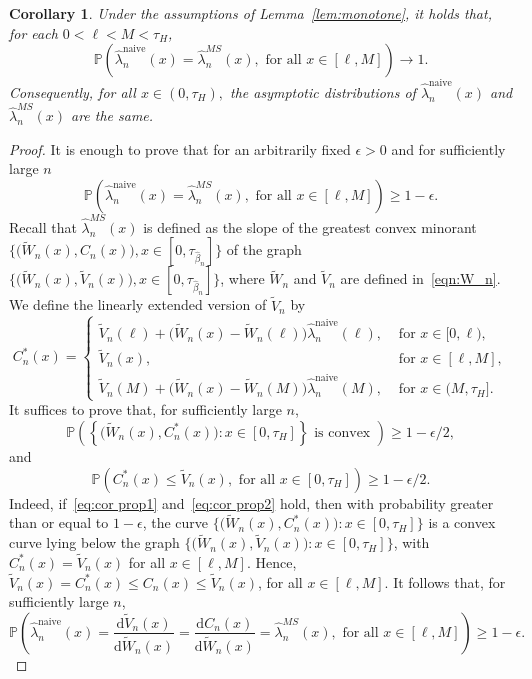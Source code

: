 \documentclass[11pt,reqno]{amsart}
\theoremstyle{definition}
\theoremstyle{plain}
\newtheorem{cor}[de]{Corollary}
\theoremstyle{remark}
\begin{document}
\begin{cor}
\label{cor:1}
Under the assumptions of Lemma~\ref{lem:monotone}, it holds that, for each $0<\ell<M<\tau_H$,
\[
{\mathbb{P}}
\left(
\hat{\lambda}_n^{\mathrm{naive}}(x)=\hat{\lambda}_n^{MS}(x),\text{ for all } x\in[\ell,M]
\right)\to 1.
\]
Consequently, for all $x\in(0,\tau_H),$ the asymptotic distributions of $\hat{\lambda}_n^{\mathrm{naive}}(x)$ and $\hat{\lambda}_n^{MS}(x)$ are the same.
\end{cor}
\begin{proof}
It is enough to prove that for an arbitrarily fixed $\epsilon>0$ and for sufficiently large $n$
\[
{\mathbb{P}}
\left(
\hat{\lambda}_n^{\mathrm{naive}}(x)=\hat{\lambda}_n^{MS}(x),\text{ for all } x\in[\ell,M]
\right)
\geq 1-\epsilon.
\]
Recall that $\hat{\lambda}^{MS}_n(x)$ is defined as the slope of the greatest convex minorant $\big\{\big(\tilde W_n(x),C_n(x)\big), x\in[0,\tau_{\hat{\beta}_n}]\big\}$ of the graph
$\big\{\big(\tilde W_n(x),\tilde V_n(x)\big),x\in[0,\tau_{\hat{\beta}_n}]\big\}$,
where $\tilde W_n$ and $\tilde V_n$ are defined in~\eqref{eqn:W_n}.
We define the linearly extended  version of $\tilde V_n$ by
\[
C^*_n(x)=
\begin{cases}
\tilde V_n(\ell)+\big(\tilde W_n(x)-\tilde W_n(\ell)\big)\hat{\lambda}_n^{\mathrm{naive}}(\ell), &\text{ for } x\in[0,\ell),\\
\tilde V_n(x), &\text{ for } x\in[\ell,M],\\
\tilde V_n(M)+\big(\tilde W_n(x)-\tilde W_n(M)\big)\hat{\lambda}_n^{\mathrm{naive}}(M), &\text{ for } x\in(M,\tau_H].
\end{cases}
\]
It suffices to prove that, for sufficiently large $n$,
\begin{equation}
\label{eq:cor prop1}
{\mathbb{P}}
\left(
\left\{
\big(\tilde W_n(x),C^*_n(x)\big):x\in[0,\tau_H]
\right\} \text{ is convex }
\right)\geq 1-\epsilon/2,
\end{equation}
and
\begin{equation}
\label{eq:cor prop2}
{\mathbb{P}}
\left(
C^*_n(x)\leq \tilde V_n(x),
\text{ for all }x\in [0,\tau_H]
\right)\geq 1-\epsilon/2.
\end{equation}
Indeed, if~\eqref{eq:cor prop1} and~\eqref{eq:cor prop2} hold,
then with probability greater than or equal to $1-\epsilon$,
the curve $\big\{\big(\tilde W_n(x),C^*_n(x)\big):x\in[0,\tau_H]\big\}$ is a convex curve lying below the graph
$\big\{\big(\tilde W_n(x),\tilde V_n(x)\big):x\in[0,\tau_H]\big\}$, with $C^*_n(x)=\tilde V_n(x)$ for all $x\in[\ell,M]$.
Hence, $\tilde V_n(x)=C^*_n(x)\leq C_n(x)\leq \tilde V_n(x)$,
for all $x\in[\ell,M]$.
It follows that, for sufficiently large $n$,
\[
{\mathbb{P}}\left(
\hat{\lambda}_n^{\mathrm{naive}}(x)=\frac{\mathrm{d}\tilde V_n(x)}{\mathrm{d}\tilde W_n(x)}=\frac{\mathrm{d}C_n(x)}{\mathrm{d}\tilde W_n(x)}=\hat{\lambda}_n^{MS}(x),
\text{ for all }x\in [\ell,M]
\right)\geq 1-\epsilon.
\]


\end{proof}
\end{document}
